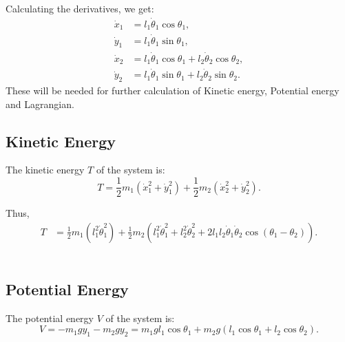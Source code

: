 \documentclass{article}
\begin{document}
Calculating the derivatives, we get:
\[
\begin{aligned}
    \dot{x}_1 &= l_1 \dot{\theta}_1 \cos \theta_1, \\
    \dot{y}_1 &= l_1 \dot{\theta}_1 \sin \theta_1, \\
    \dot{x}_2 &= l_1 \dot{\theta}_1 \cos \theta_1 + l_2 \dot{\theta}_2 \cos \theta_2, \\
    \dot{y}_2 &= l_1 \dot{\theta}_1 \sin \theta_1 + l_2 \dot{\theta}_2 \sin \theta_2.
\end{aligned}
\]
These will be needed for further calculation of Kinetic energy, Potential energy and Lagrangian.
\\
\subsection{Kinetic Energy}
The kinetic energy \(T\) of the system is:
\[
T = \frac{1}{2} m_1 (\dot{x}_1^2 + \dot{y}_1^2) + \frac{1}{2} m_2 (\dot{x}_2^2 + \dot{y}_2^2).
\]

Thus,
\[
\begin{aligned}
    T &= \frac{1}{2} m_1 (l_1^2 \dot{\theta}_1^2) + \frac{1}{2} m_2 (l_1^2 \dot{\theta}_1^2 + l_2^2 \dot{\theta}_2^2 + 2 l_1 l_2 \dot{\theta}_1 \dot{\theta}_2 \cos(\theta_1 - \theta_2)).
\end{aligned}
\]
\\
\subsection{Potential Energy}

The potential energy \(V\) of the system is:
\[
V = -m_1 g y_1 - m_2 g y_2 = m_1 g l_1 \cos \theta_1 + m_2 g (l_1 \cos \theta_1 + l_2 \cos \theta_2).
\]
\\
\end{document}
